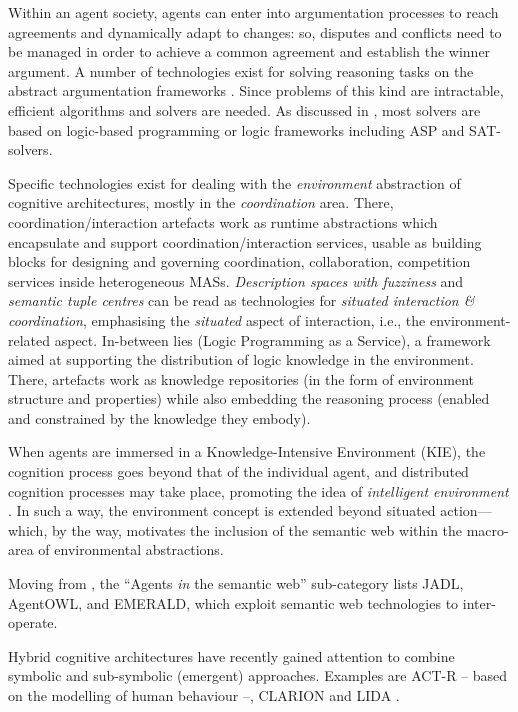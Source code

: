 \documentclass[12pt,a4paper,openright,twoside]{book}
\begin{document}
Within an agent society, agents can enter into argumentation processes to reach agreements and dynamically adapt to changes: so, disputes and conflicts need to be managed in order to achieve a common agreement and establish the winner argument.
%
A number of technologies exist for solving reasoning tasks on the abstract argumentation frameworks \cite{Dung:1995:AAF:220193.220197}.
%
Since problems of this kind are intractable, efficient algorithms and solvers are needed.
%
As discussed in \cite{Gaggl_Linsbichler_Maratea_Woltran_2018}, most solvers are based on logic-based programming or logic frameworks including ASP and SAT-solvers.

Specific technologies exist for dealing with the \emph{environment} abstraction of cognitive architectures, mostly in the \emph{coordination} area.
%
There, coordination/interaction artefacts work as runtime abstractions which encapsulate and support coordination/interaction services, usable as building blocks for designing and governing coordination, collaboration,  competition services inside heterogeneous MASs.
%
\emph{Description spaces with fuzziness} \cite{DBLP:conf/sac/NardiniOV11} and \emph{semantic tuple centres} \cite{DBLP:conf/sac/NardiniVP10} can be read as technologies for \emph{situated interaction \& coordination}, emphasising the \emph{situated} aspect of interaction, i.e., the environment-related aspect.
%
In-between lies \lpaas{} (Logic Programming as a Service), a framework aimed at supporting the distribution of logic knowledge in the environment.
%
There, artefacts work as knowledge repositories (in the form of environment structure and properties) while also embedding the reasoning process (enabled and constrained by the knowledge they embody).

When agents are immersed in a Knowledge-Intensive Environment (KIE), the cognition process goes beyond that of the individual agent, and distributed cognition processes may take place, promoting the idea of \emph{intelligent environment} \cite{distributedcognition-hollan-2000}.
%
In such a way, the environment concept is extended beyond situated action---which, by the way, motivates the inclusion of the semantic web within the macro-area of environmental abstractions.

Moving from \cite{Hendler2001}, the ``Agents \emph{in} the semantic web'' sub-category lists JADL, AgentOWL, and EMERALD, which exploit semantic web technologies to inter-operate.

Hybrid cognitive architectures have recently gained attention to combine symbolic and sub-symbolic (emergent) approaches.
%
Examples are ACT-R \cite{Anderson2003} -- based on the modelling of human behaviour --, CLARION \cite{Sun2005} and LIDA \cite{franklin2006}.
\end{document}
